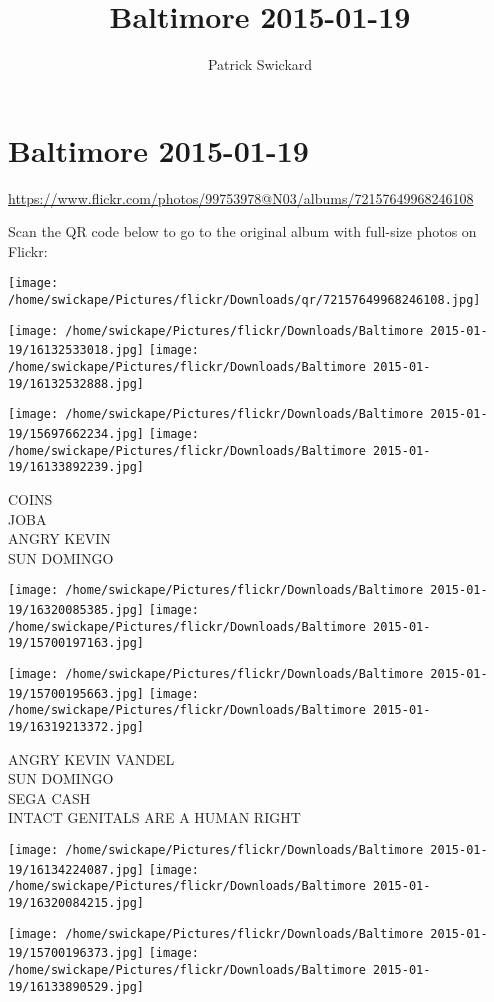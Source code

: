\documentclass[10pt,letterpaper]{article}
\title{Baltimore 2015-01-19}
\author{Patrick Swickard}
\date{}
\begin{document}
\section*{Baltimore 2015-01-19}

\url{https://www.flickr.com/photos/99753978@N03/albums/72157649968246108}

Scan the QR code below to go to the original album with full-size photos on Flickr:

\texttt{[image: /home/swickape/Pictures/flickr/Downloads/qr/72157649968246108.jpg]}
\pagebreak

\texttt{[image: /home/swickape/Pictures/flickr/Downloads/Baltimore 2015-01-19/16132533018.jpg]}
\texttt{[image: /home/swickape/Pictures/flickr/Downloads/Baltimore 2015-01-19/16132532888.jpg]}

\texttt{[image: /home/swickape/Pictures/flickr/Downloads/Baltimore 2015-01-19/15697662234.jpg]}
\texttt{[image: /home/swickape/Pictures/flickr/Downloads/Baltimore 2015-01-19/16133892239.jpg]}

COINS\\
JOBA\\
ANGRY KEVIN\\
SUN DOMINGO
\pagebreak

\texttt{[image: /home/swickape/Pictures/flickr/Downloads/Baltimore 2015-01-19/16320085385.jpg]}
\texttt{[image: /home/swickape/Pictures/flickr/Downloads/Baltimore 2015-01-19/15700197163.jpg]}

\texttt{[image: /home/swickape/Pictures/flickr/Downloads/Baltimore 2015-01-19/15700195663.jpg]}
\texttt{[image: /home/swickape/Pictures/flickr/Downloads/Baltimore 2015-01-19/16319213372.jpg]}

ANGRY KEVIN VANDEL\\
SUN DOMINGO\\
SEGA CASH\\
INTACT GENITALS ARE A HUMAN RIGHT
\pagebreak

\texttt{[image: /home/swickape/Pictures/flickr/Downloads/Baltimore 2015-01-19/16134224087.jpg]}
\texttt{[image: /home/swickape/Pictures/flickr/Downloads/Baltimore 2015-01-19/16320084215.jpg]}

\texttt{[image: /home/swickape/Pictures/flickr/Downloads/Baltimore 2015-01-19/15700196373.jpg]}
\texttt{[image: /home/swickape/Pictures/flickr/Downloads/Baltimore 2015-01-19/16133890529.jpg]}
\end{document}
